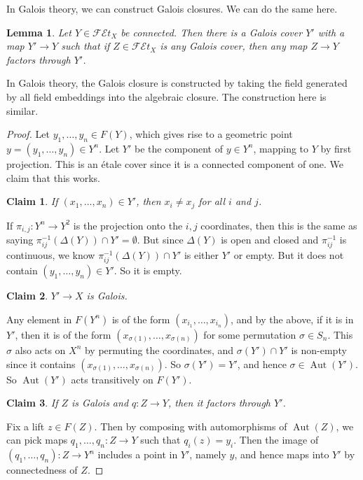 \documentclass{shortart}
\newtheorem*{lemma}{Lemma}
\newtheorem*{claim}{Claim}
\theoremstyle{definition}
\newcommand\FEt[1]{\mathscr{FE}t_{#1}}
\DeclareMathOperator\Aut{Aut}
\begin{document}
In Galois theory, we can construct Galois closures. We can do the same here.
\begin{lemma}
  Let $Y \in \FEt{X}$ be connected. Then there is a Galois cover $Y'$ with a map $Y' \to Y$ such that if $Z \in \FEt{X}$ is any Galois cover, then any map $Z \to Y$ factors through $Y'$.
\end{lemma}
In Galois theory, the Galois closure is constructed by taking the field generated by all field embeddings into the algebraic closure. The construction here is similar.

\begin{proof}\leavevmode
  Let $y_1, \ldots, y_n \in F(Y)$, which gives rise to a geometric point $y = (y_1, \ldots, y_n) \in Y^n$. Let $Y'$ be the component of $y \in Y^n$, mapping to $Y$ by first projection. This is an \'etale cover since it is a connected component of one. We claim that this works.
  
  \begin{claim}
    If $(x_1, \ldots, x_n) \in Y'$, then $x_i \not= x_j$ for all $i$ and $j$.
  \end{claim}
  If $\pi_{i, j}: Y^n \to Y^2$ is the projection onto the $i, j$ coordinates, then this is the same as saying $\pi_{ij}^{-1}(\Delta(Y)) \cap Y' = \emptyset$. But since $\Delta(Y)$ is open and closed and $\pi_{ij}^{-1}$ is continuous, we know $\pi_{ij}^{-1}(\Delta(Y)) \cap Y'$ is either $Y'$ or empty. But it does not contain $(y_1, \ldots, y_n) \in Y'$. So it is empty.

  \begin{claim}
    $Y' \to X$ is Galois.
  \end{claim}
  Any element in $F(Y^n)$ is of the form $(x_{i_1}, \ldots, x_{i_n})$, and by the above, if it is in $Y'$, then it is of the form $(x_{\sigma(1)}, \ldots, x_{\sigma(n)})$ for some permutation $\sigma \in S_n$. This $\sigma$ also acts on $X^n$ by permuting the coordinates, and $\sigma(Y') \cap Y'$ is non-empty since it contains $(x_{\sigma(1)}, \ldots, x_{\sigma(n)})$. So $\sigma(Y') = Y'$, and hence $\sigma \in \Aut(Y')$. So $\Aut(Y')$ acts transitively on $F(Y')$.

  \begin{claim}
    If $Z$ is Galois and $q: Z \to Y$, then it factors through $Y'$.
  \end{claim}

  Fix a lift $z \in F(Z)$. Then by composing with automorphisms of $\Aut(Z)$, we can pick maps $q_1, \ldots, q_n: Z \to Y$ such that $q_i(z) = y_i$. Then the image of $(q_1, \ldots, q_n): Z \to Y^n$ includes a point in $Y'$, namely $y$, and hence maps into $Y'$ by connectedness of $Z$.
\end{proof}
\end{document}
